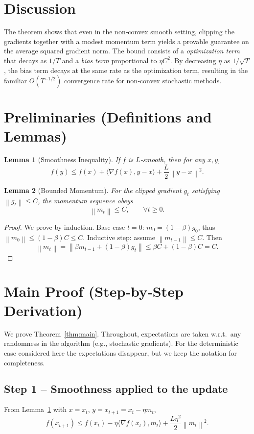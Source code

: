 \documentclass{article}
\newtheorem{lemma}{Lemma}
\newcommand{\norm}[1]{\left\lVert #1\right\rVert}
\newcommand{\grad}{\nabla}
\begin{document}
\section*{Discussion}
The theorem shows that even in the non‑convex smooth setting, clipping the gradients together with a modest momentum term yields a provable guarantee on the average squared gradient norm. The bound consists of a \emph{optimization term} that decays as $1/T$ and a \emph{bias term} proportional to $\eta C^2$. By decreasing $\eta$ as $1/\sqrt{T}$, the bias term decays at the same rate as the optimization term, resulting in the familiar $O(T^{-1/2})$ convergence rate for non‑convex stochastic methods.

\newpage

\section*{Preliminaries (Definitions and Lemmas)}
\begin{lemma}[Smoothness Inequality]\label{lem:smooth}
If $f$ is $L$‑smooth, then for any $x,y$,
\[
f(y)\le f(x)+\langle\grad f(x),y-x\rangle+\frac{L}{2}\norm{y-x}^2 .
\]
\end{lemma}
\begin{lemma}[Bounded Momentum]\label{lem:bounded-m}
For the clipped gradient $g_t$ satisfying $\norm{g_t}\le C$, the momentum sequence obeys
\[
\norm{m_t}\le C,\qquad\forall t\ge0 .
\]
\end{lemma}
\begin{proof}
We prove by induction.  
Base case $t=0$: $m_0=(1-\beta)g_0$, thus $\norm{m_0}\le (1-\beta)C\le C$.  
Inductive step: assume $\norm{m_{t-1}}\le C$. Then
\[
\norm{m_t}= \norm{\beta m_{t-1}+(1-\beta)g_t}
\le \beta C+(1-\beta)C = C .
\]
\end{proof}

\section*{Main Proof (Step‑by‑Step Derivation)}
We prove Theorem~\ref{thm:main}. Throughout, expectations are taken w.r.t.\ any randomness in the algorithm (e.g., stochastic gradients). For the deterministic case considered here the expectations disappear, but we keep the notation for completeness.

\subsection*{Step 1 – Smoothness applied to the update}
From Lemma~\ref{lem:smooth} with $x=x_t$, $y=x_{t+1}=x_t-\eta m_t$,
\[
f(x_{t+1})\le f(x_t)-\eta\langle\grad f(x_t),m_t\rangle+\frac{L\eta^2}{2}\norm{m_t}^2 .
\tag{1}
\]
\end{document}
